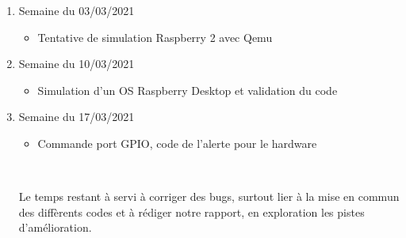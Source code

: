 \documentclass[a4paper]{report}
\begin{document}
\begin{enumerate}
\begin{itemize}
            \end{itemize}
        \item Semaine du 03/03/2021
            \begin{itemize}
                \item Tentative de simulation Raspberry 2 avec Qemu
            \end{itemize}
        \item Semaine du 10/03/2021
            \begin{itemize}
                \item Simulation d'un OS Raspberry Desktop et validation du code
            \end{itemize}
        \item Semaine du 17/03/2021
            \begin{itemize}
                \item Commande port GPIO, code de l'alerte pour le hardware
            \end{itemize} \

        Le temps restant à servi à corriger des bugs, surtout lier à la mise en commun 
        des diffèrents codes et à rédiger notre rapport, en exploration les pistes d'amélioration.
    \end{enumerate}

    
    
\end{document}
